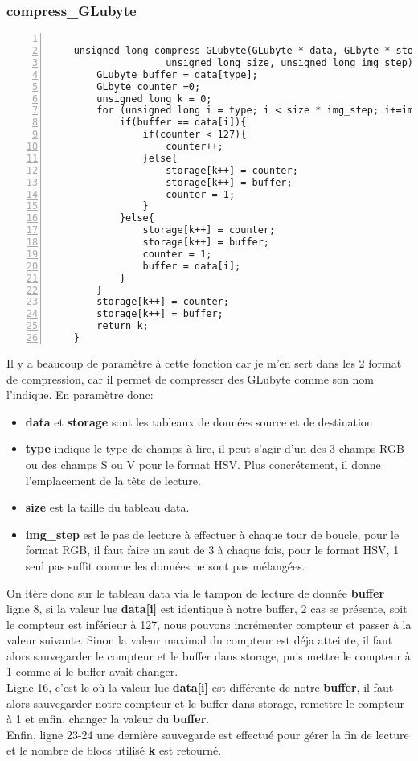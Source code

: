 \documentclass[12pt, letterpaper]{article}
\begin{document}
\subsubsection{compress\_GLubyte}
\begin{Verbatim}[numbers=left,xleftmargin = 5mm]

    unsigned long compress_GLubyte(GLubyte * data, GLbyte * storage, int type, 
                    unsigned long size, unsigned long img_step){
        GLubyte buffer = data[type];
        GLbyte counter =0;
        unsigned long k = 0;
        for (unsigned long i = type; i < size * img_step; i+=img_step){
            if(buffer == data[i]){
                if(counter < 127){
                    counter++;
                }else{
                    storage[k++] = counter; 
                    storage[k++] = buffer;
                    counter = 1;
                }
            }else{
                storage[k++] = counter; 
                storage[k++] = buffer;
                counter = 1;
                buffer = data[i];
            }
        }
        storage[k++] = counter; 
        storage[k++] = buffer;
        return k;
    }
\end{Verbatim}
Il y a beaucoup de paramètre à cette fonction car je m'en sert dans les 2 format de compression, car il permet de compresser des GLubyte comme son nom l'indique. En paramètre donc:
\begin{itemize}
    \item \textbf{data} et \textbf{storage} sont les tableaux de données source et de destination
    \item \textbf{type} indique le type de champs à lire, il peut s'agir d'un des 3 champs RGB ou des champs S ou V pour le format HSV.
    Plus concrétement, il donne l'emplacement de la tête de lecture.
    \item \textbf{size} est la taille du tableau data.
    \item \textbf{img\_step} est le pas de lecture à effectuer à chaque tour de boucle, pour le format RGB, il faut faire un saut de 3 à chaque fois, pour le format HSV, 1 seul pas suffit comme les données ne sont pas mélangées.
\end{itemize}
On itère donc sur le tableau data via le tampon de lecture de donnée \textbf{buffer}\\
ligne 8, si la valeur lue \textbf{data[i]} est identique à notre buffer,
2 cas se présente, soit le compteur est inférieur à 127, 
nous pouvons incrémenter compteur et passer à la valeur suivante. 
Sinon la valeur maximal du compteur est déja atteinte,
il faut alors sauvegarder le compteur et le buffer dans storage, 
puis mettre le compteur à 1 comme si le buffer avait changer.\\
Ligne 16, c'est le où la valeur lue \textbf{data[i]} est différente de notre \textbf{buffer}, il faut alors sauvegarder notre compteur et le buffer dans storage, remettre le compteur à 1 et enfin, changer la valeur du \textbf{buffer}.\\
Enfin, ligne 23-24 une dernière sauvegarde est effectué pour gérer la fin de lecture et le nombre de blocs utilisé \textbf{k} est retourné.
\end{document}
